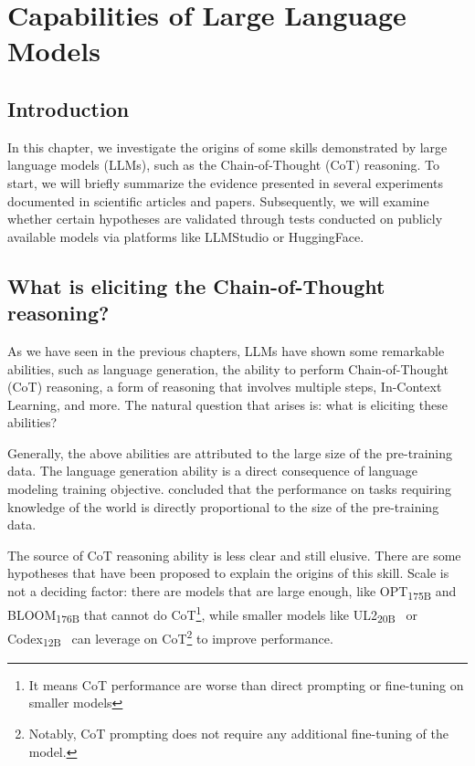 
\chapter{Capabilities of Large Language Models}
\label{ch:capabilities}

\section{Introduction}
\label{sec:ch4-introduction}

In this chapter, we investigate the origins of some skills demonstrated by large language models (LLMs), such as the Chain-of-Thought (CoT) reasoning.
To start, we will briefly summarize the evidence presented in several experiments documented in scientific articles and papers.
Subsequently, we will examine whether certain hypotheses are validated through tests conducted on publicly available models via platforms like LLMStudio or HuggingFace.

\section{What is eliciting the Chain-of-Thought reasoning?}
\label{sec:what-is-eliciting-the-chain-of-thought-reasoning?}

As we have seen in the previous chapters, LLMs have shown some remarkable abilities, such as language generation, the ability to perform Chain-of-Thought (CoT) reasoning, a form of reasoning that involves multiple steps, In-Context Learning, and more.
The natural question that arises is: what is eliciting these abilities?

Generally, the above abilities are attributed to the large size of the pre-training data.
The language generation ability is a direct consequence of language modeling training objective.
\textcite{liang2022holistic} concluded that the performance on tasks requiring knowledge of the world is directly proportional to the size of the pre-training data.

The source of CoT reasoning ability is less clear and still elusive.
There are some hypotheses that have been proposed to explain the origins of this skill.
Scale is not a deciding factor: there are models that are large enough, like OPT\textsubscript{175B} and BLOOM\textsubscript{176B} that cannot do CoT\footnote{It means CoT performance are worse than direct prompting or fine-tuning on smaller models}, while smaller models like UL2\textsubscript{20B}~\cite{tay2023ul2unifyinglanguagelearning} or Codex\textsubscript{12B}~\cite{chen2021evaluating} can leverage on CoT\footnote{Notably, CoT prompting does not require any additional fine-tuning of the model.} to improve performance.

